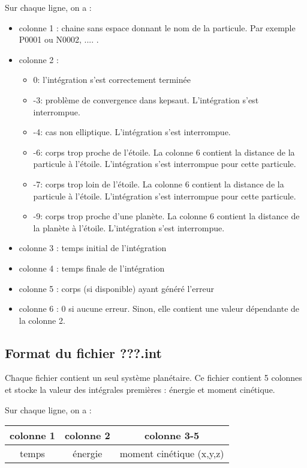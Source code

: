 \documentclass[11pt]{article}
\begin{document}
Sur chaque ligne, on a :
\begin{itemize}
\item colonne 1 : chaine sans espace donnant le nom de la particule. Par exemple P0001 ou N0002, .... .
\item colonne 2 : 
\begin{itemize}
\item 0: l'int\'egration s'est correctement termin\'ee
\item -3: probl\`eme de convergence dans kepsaut. L'int\'egration s'est interrompue.
\item -4: cas non elliptique.  L'int\'egration s'est interrompue.
\item -6: corps trop proche de l'\'etoile.  La colonne 6 contient la distance de la particule \`a l'\'etoile. L'int\'egration s'est interrompue pour cette particule.
\item -7: corps trop loin de l'\'etoile.  La colonne 6 contient la distance de la particule \`a l'\'etoile. L'int\'egration s'est interrompue pour cette particule.
\item -9: corps trop proche d'une plan\`ete.  La colonne 6 contient la distance de la plan\`ete \`a l'\'etoile. L'int\'egration s'est interrompue.
\end{itemize}
\item colonne 3 : temps initial de l'int\'egration
\item colonne 4 : temps finale de l'int\'egration
\item colonne 5 : corps (si disponible) ayant g\'en\'er\'e l'erreur
\item colonne 6 : 0 si aucune erreur. Sinon, elle contient une valeur d\'ependante de la colonne 2.
\end{itemize}


\subsection{Format du fichier {\bf ???.int} }

Chaque fichier contient un seul syst\`eme plan\'etaire.
Ce fichier contient 5 colonnes et stocke la valeur des int\'egrales premi\`eres  : \'energie et moment cin\'etique.

Sur chaque ligne, on a : 

\begin{tabular}{|c|c|c|} \hline
colonne 1 &  colonne 2 & colonne 3-5 \\ \hline
temps & \'energie & moment cin\'etique (x,y,z)\\    \hline
\end{tabular}
\end{document}

